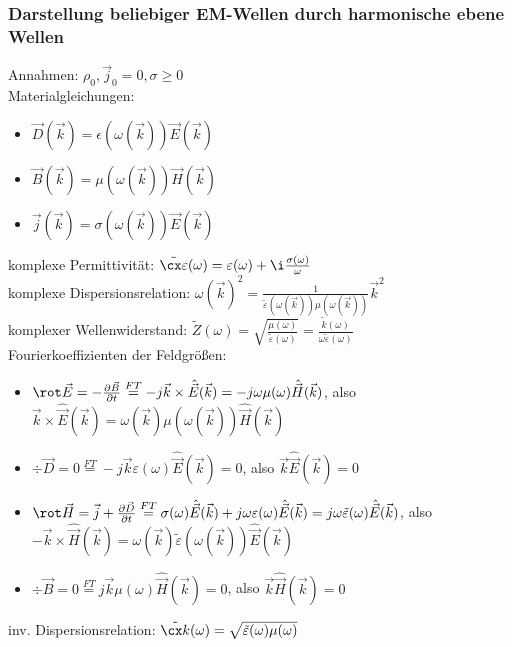 \documentclass[german, fourcolumn, 6pt]{latex4ei/latex4ei_sheet}
\begin{document}
    \subsubsection{Darstellung beliebiger EM-Wellen durch harmonische ebene Wellen}
    Annahmen: $\rho_0, \vec j_0 = 0, \sigma \geq 0$\\
    Materialgleichungen:
    \begin{itemize}
    \item $\vec D(\vec k) = \epsilon(\omega(\vec k))\vec E(\vec k)$
    \item $\vec B(\vec k) = \mu(\omega(\vec k))\vec H(\vec k)$
    \item $\vec j(\vec k) = \sigma(\omega(\vec k))\vec E(\vec k)$
    \end{itemize}
    komplexe Permittivität: $\tilde{\cx \varepsilon}(\omega) = \varepsilon(\omega) + \i \frac{\sigma(\omega)}{\omega}$\\
    komplexe Dispersionsrelation: $\omega(\vec{k})^2=\frac{1}{\tilde{\varepsilon}(\omega(\vec k))\mu(\omega(\vec k))}\vec k^2$\\
    komplexer Wellenwiderstand: $\tilde{Z}(\omega) = \sqrt{\frac{\mu(\omega)}{\tilde{\varepsilon}(\omega)}} = \frac{\tilde{k}(\omega)}{\omega\tilde{\varepsilon}(\omega)}$\\
    Fourierkoeffizienten der Feldgrößen:
    \begin{itemize}
    \item $\rot\vec E = -\frac{\partial\vec B}{\partial t} \overset{FT}{=} -j\vec k \times\hat{\vec E}(\vec k) = -j\omega\mu(\omega)\hat{\vec H}(\vec k)$, also $\vec k\times\hat{\vec E}(\vec k) = \omega(\vec k)\mu(\omega(\vec k))\hat{\vec H}(\vec k)$
    \item $\div\vec D = 0 \overset{FT}{=} -j\vec k\varepsilon(\omega)\hat{\vec E}(\vec k) = 0$, also $\vec k\hat{\vec E}(\vec k) = 0$
    \item $\rot\vec H = \vec j + \frac{\partial\vec D}{\partial t} \overset{FT}{=} \sigma(\omega)\hat{\vec E}(\vec k)+j\omega\varepsilon(\omega)\hat{\vec E}(\vec k) = j\omega\tilde{\varepsilon}(\omega)\hat{\vec E}(\vec k)$, also $-\vec k\times\hat{\vec H}(\vec k) = \omega(\vec k)\tilde{\varepsilon}(\omega(\vec k))\hat{\vec E}(\vec k)$
    \item $\div\vec B = 0 \overset{FT}{=} j\vec k\mu(\omega)\hat{\vec H}(\vec k) = 0$, also $\vec k\hat{\vec H}(\vec k) = 0$
    \end{itemize}
    inv. Dispersionsrelation: $\tilde{\cx k}(\omega) = \sqrt{\tilde{\varepsilon}(\omega)\mu(\omega)}$\\
\end{document}
